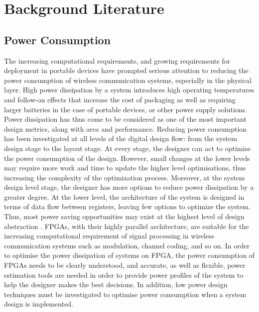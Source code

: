 \chapter{Background Literature}
\label{chap:BackgroundLiterature}

\section{Power Consumption}

The increasing computational requirements, and growing requirements for deployment in portable devices have prompted serious attention to reducing the power consumption of wireless communication systems, especially in the physical layer. 
High power dissipation by a system introduces high operating temperatures and follow-on effects that increase the cost of packaging as well as requiring larger batteries in the case of portable devices, or other power supply solutions.
Power dissipation has thus come to be considered as one of the most important design metrics, along with area and performance.
Reducing power consumption has been investigated at all levels of the digital design flow: from the system design stage to the layout stage. 
At every stage, the designer can act to optimise the power consumption of the design.
However, small changes at the lower levels may require more work and time to update the higher level optimisations, thus increasing the complexity of the optimization process. 
Moreover, at the system design level stage, the designer has more options to reduce power dissipation by a greater degree.
At the lower level, the architecture of the system is designed in terms of data flow between registers, leaving few options to optimize the system. 
Thus, most power saving opportunities may exist at the highest level of design abstraction \cite{Raghunathan1998}.
FPGAs, with their highly parallel architecture, are suitable for the increasing computational requirement of signal processing in wireless communication systems such as modulation, channel coding, and so on.
In order to optimise the power dissipation of systems on FPGA, the power consumption of FPGAs needs to be clearly understood, and accurate, as well as flexible, power estimation tools are needed in order to provide power profiles of the system to help the designer makes the best decisions.
In addition, low power design techniques must be investigated to optimise power consumption when a system design is implemented.

